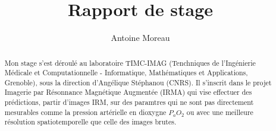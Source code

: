 \documentclass[a4paper,10pt]{article}
\title{Rapport de stage}
\author{Antoine Moreau}
\begin{document}
\maketitle

\begin{abstract}
Mon stage s'est d\'eroul\'e au laboratoire TIMC-IMAG (Tenchniques de l'Ingénierie M\'edicale et Computationnelle - %
Informatique, Mathématiques et Applications, Grenoble), sous la direction d'Angélique Stéphanou (CNRS). %
Il s'inscrit dans le projet Imagerie par Résonnance Magn\'etique Augment\'ee (IRMA) qui vise  effectuer des pr\'edictions, %
 partir d'images IRM, sur des paramtres qui ne sont pas directement mesurables comme la pression art\'erielle en dioxygne $P_aO_2$ %
ou avec une meilleure r\'esolution spatiotemporelle que celle des images brutes.

\end{abstract}










\end{document}
